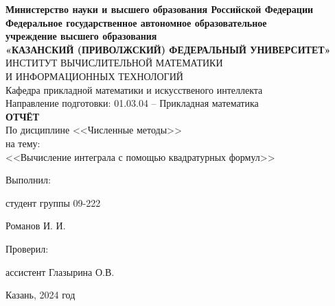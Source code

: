 \documentclass[a4paper,12pt]{article}
\begin{document}
\begin{center}
\hfill \break
\textbf{\large{Министерство науки и высшего образования Российской Федерации\\
Федеральное государственное автономное образовательное\\
учреждение высшего образования}}
\\
\large{\textbf{«КАЗАНСКИЙ (ПРИВОЛЖСКИЙ) ФЕДЕРАЛЬНЫЙ УНИВЕРСИТЕТ»}}\\
\hfill \break
\large{ИНСТИТУТ ВЫЧИСЛИТЕЛЬНОЙ МАТЕМАТИКИ\\ И ИНФОРМАЦИОННЫХ ТЕХНОЛОГИЙ}\\
 \hfill \break
\large{Кафедра прикладной математики и искусственого интеллекта}\\
\hfill\break
\hfill \break
\large{Направление подготовки: 01.03.04 – Прикладная математика}\\
\hfill \break
\hfill \break
\textbf{\large{ОТЧЁТ}}\\
\large{По дисциплине <<Численные методы>>}\\
\large{на тему:}\\
\large{<<Вычисление интеграла с помощью квадратурных формул>>}\\
\hfill \break
\hfill \break
\end{center}

\hfill \break
\begin{flushright}
			
    \large{Выполнил:}
    
    \large{студент группы 09-222}
    
    \large{Романов И. И.}
    
    \large{Проверил:}
    
    \large{ассистент Глазырина О.В.}
    
\end{flushright}
\vfill
\begin{center} \large{Казань, 2024 год} \end{center}
\thispagestyle{empty}
 
\end{document}
